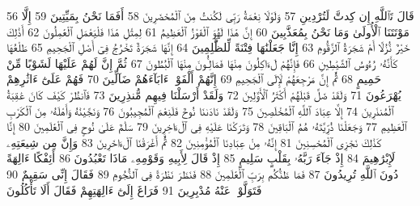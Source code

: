 {\tiny\colorbox{cl_aya}{56}} قَالَ تَٱللَّهِ إِن كِدتَّ لَتُرْدِينِ
{\tiny\colorbox{cl_aya}{57}} وَلَوْلَا نِعْمَةُ رَبِّى لَكُنتُ مِنَ ٱلْمُحْضَرِينَ
{\tiny\colorbox{cl_aya}{58}} أَفَمَا نَحْنُ بِمَيِّتِينَ
{\tiny\colorbox{cl_aya}{59}} إِلَّا مَوْتَتَنَا ٱلْأُولَىٰ وَمَا نَحْنُ بِمُعَذَّبِينَ
{\tiny\colorbox{cl_aya}{60}} إِنَّ هَٰذَا لَهُوَ ٱلْفَوْزُ ٱلْعَظِيمُ
{\tiny\colorbox{cl_aya}{61}} لِمِثْلِ هَٰذَا فَلْيَعْمَلِ ٱلْعَٰمِلُونَ
{\tiny\colorbox{cl_aya}{62}} أَذَٰلِكَ خَيْرٌ نُّزُلًا أَمْ شَجَرَةُ ٱلزَّقُّومِ
{\tiny\colorbox{cl_aya}{63}} إِنَّا جَعَلْنَٰهَا فِتْنَةً لِّلظَّٰلِمِينَ
{\tiny\colorbox{cl_aya}{64}} إِنَّهَا شَجَرَةٌ تَخْرُجُ فِىٓ أَصْلِ ٱلْجَحِيمِ
{\tiny\colorbox{cl_aya}{65}} طَلْعُهَا كَأَنَّهُۥ رُءُوسُ ٱلشَّيَٰطِينِ
{\tiny\colorbox{cl_aya}{66}} فَإِنَّهُمْ لَءَاكِلُونَ مِنْهَا فَمَالِـُٔونَ مِنْهَا ٱلْبُطُونَ
{\tiny\colorbox{cl_aya}{67}} ثُمَّ إِنَّ لَهُمْ عَلَيْهَا لَشَوْبًا مِّنْ حَمِيمٍ
{\tiny\colorbox{cl_aya}{68}} ثُمَّ إِنَّ مَرْجِعَهُمْ لَإِلَى ٱلْجَحِيمِ
{\tiny\colorbox{cl_aya}{69}} إِنَّهُمْ أَلْفَوْا۟ ءَابَآءَهُمْ ضَآلِّينَ
{\tiny\colorbox{cl_aya}{70}} فَهُمْ عَلَىٰٓ ءَاثَٰرِهِمْ يُهْرَعُونَ
{\tiny\colorbox{cl_aya}{71}} وَلَقَدْ ضَلَّ قَبْلَهُمْ أَكْثَرُ ٱلْأَوَّلِينَ
{\tiny\colorbox{cl_aya}{72}} وَلَقَدْ أَرْسَلْنَا فِيهِم مُّنذِرِينَ
{\tiny\colorbox{cl_aya}{73}} فَٱنظُرْ كَيْفَ كَانَ عَٰقِبَةُ ٱلْمُنذَرِينَ
{\tiny\colorbox{cl_aya}{74}} إِلَّا عِبَادَ ٱللَّهِ ٱلْمُخْلَصِينَ
{\tiny\colorbox{cl_aya}{75}} وَلَقَدْ نَادَىٰنَا نُوحٌ فَلَنِعْمَ ٱلْمُجِيبُونَ
{\tiny\colorbox{cl_aya}{76}} وَنَجَّيْنَٰهُ وَأَهْلَهُۥ مِنَ ٱلْكَرْبِ ٱلْعَظِيمِ
{\tiny\colorbox{cl_aya}{77}} وَجَعَلْنَا ذُرِّيَّتَهُۥ هُمُ ٱلْبَاقِينَ
{\tiny\colorbox{cl_aya}{78}} وَتَرَكْنَا عَلَيْهِ فِى ٱلْءَاخِرِينَ
{\tiny\colorbox{cl_aya}{79}} سَلَٰمٌ عَلَىٰ نُوحٍ فِى ٱلْعَٰلَمِينَ
{\tiny\colorbox{cl_aya}{80}} إِنَّا كَذَٰلِكَ نَجْزِى ٱلْمُحْسِنِينَ
{\tiny\colorbox{cl_aya}{81}} إِنَّهُۥ مِنْ عِبَادِنَا ٱلْمُؤْمِنِينَ
{\tiny\colorbox{cl_aya}{82}} ثُمَّ أَغْرَقْنَا ٱلْءَاخَرِينَ
{\tiny\colorbox{cl_aya}{83}} وَإِنَّ مِن شِيعَتِهِۦ لَإِبْرَٰهِيمَ
{\tiny\colorbox{cl_aya}{84}} إِذْ جَآءَ رَبَّهُۥ بِقَلْبٍ سَلِيمٍ
{\tiny\colorbox{cl_aya}{85}} إِذْ قَالَ لِأَبِيهِ وَقَوْمِهِۦ مَاذَا تَعْبُدُونَ
{\tiny\colorbox{cl_aya}{86}} أَئِفْكًا ءَالِهَةً دُونَ ٱللَّهِ تُرِيدُونَ
{\tiny\colorbox{cl_aya}{87}} فَمَا ظَنُّكُم بِرَبِّ ٱلْعَٰلَمِينَ
{\tiny\colorbox{cl_aya}{88}} فَنَظَرَ نَظْرَةً فِى ٱلنُّجُومِ
{\tiny\colorbox{cl_aya}{89}} فَقَالَ إِنِّى سَقِيمٌ
{\tiny\colorbox{cl_aya}{90}} فَتَوَلَّوْا۟ عَنْهُ مُدْبِرِينَ
{\tiny\colorbox{cl_aya}{91}} فَرَاغَ إِلَىٰٓ ءَالِهَتِهِمْ فَقَالَ أَلَا تَأْكُلُونَ
